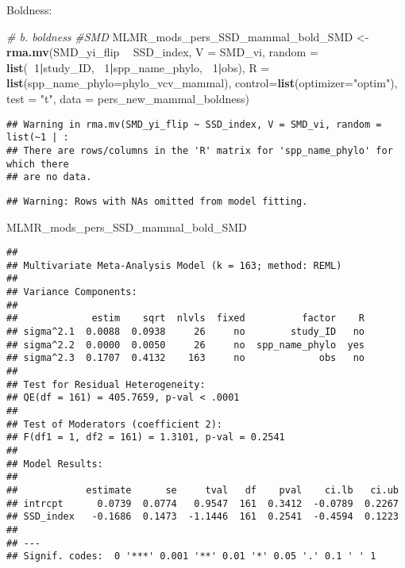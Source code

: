 \documentclass[]{article}
\newenvironment{Shaded}{\begin{snugshade}}{\end{snugshade}}
\newcommand{\KeywordTok}[1]{\textcolor[rgb]{0.13,0.29,0.53}{\textbf{#1}}}
\newcommand{\DataTypeTok}[1]{\textcolor[rgb]{0.13,0.29,0.53}{#1}}
\newcommand{\DecValTok}[1]{\textcolor[rgb]{0.00,0.00,0.81}{#1}}
\newcommand{\StringTok}[1]{\textcolor[rgb]{0.31,0.60,0.02}{#1}}
\newcommand{\CommentTok}[1]{\textcolor[rgb]{0.56,0.35,0.01}{\textit{#1}}}
\newcommand{\OperatorTok}[1]{\textcolor[rgb]{0.81,0.36,0.00}{\textbf{#1}}}
\newcommand{\NormalTok}[1]{#1}
\begin{document}
Boldness:

\begin{Shaded}
\begin{Highlighting}[]
    \CommentTok{# b. boldness}
    \CommentTok{#SMD}
\NormalTok{    MLMR_mods_pers_SSD_mammal_bold_SMD <-}\StringTok{ }\KeywordTok{rma.mv}\NormalTok{(SMD_yi_flip }\OperatorTok{~}\StringTok{ }\NormalTok{SSD_index, }\DataTypeTok{V =}\NormalTok{ SMD_vi, }
                                              \DataTypeTok{random =} \KeywordTok{list}\NormalTok{(}\OperatorTok{~}\DecValTok{1}\OperatorTok{|}\NormalTok{study_ID, }\OperatorTok{~}\DecValTok{1}\OperatorTok{|}\NormalTok{spp_name_phylo, }\OperatorTok{~}\DecValTok{1}\OperatorTok{|}\NormalTok{obs), }
                                              \DataTypeTok{R =} \KeywordTok{list}\NormalTok{(}\DataTypeTok{spp_name_phylo=}\NormalTok{phylo_vcv_mammal), }\DataTypeTok{control=}\KeywordTok{list}\NormalTok{(}\DataTypeTok{optimizer=}\StringTok{"optim"}\NormalTok{), }
                                              \DataTypeTok{test =} \StringTok{"t"}\NormalTok{, }\DataTypeTok{data =}\NormalTok{ pers_new_mammal_boldness)}
\end{Highlighting}
\end{Shaded}

\begin{verbatim}
## Warning in rma.mv(SMD_yi_flip ~ SSD_index, V = SMD_vi, random = list(~1 | :
## There are rows/columns in the 'R' matrix for 'spp_name_phylo' for which there
## are no data.
\end{verbatim}

\begin{verbatim}
## Warning: Rows with NAs omitted from model fitting.
\end{verbatim}

\begin{Shaded}
\begin{Highlighting}[]
\NormalTok{    MLMR_mods_pers_SSD_mammal_bold_SMD    }
\end{Highlighting}
\end{Shaded}

\begin{verbatim}
## 
## Multivariate Meta-Analysis Model (k = 163; method: REML)
## 
## Variance Components:
## 
##             estim    sqrt  nlvls  fixed          factor    R 
## sigma^2.1  0.0088  0.0938     26     no        study_ID   no 
## sigma^2.2  0.0000  0.0050     26     no  spp_name_phylo  yes 
## sigma^2.3  0.1707  0.4132    163     no             obs   no 
## 
## Test for Residual Heterogeneity:
## QE(df = 161) = 405.7659, p-val < .0001
## 
## Test of Moderators (coefficient 2):
## F(df1 = 1, df2 = 161) = 1.3101, p-val = 0.2541
## 
## Model Results:
## 
##            estimate      se     tval   df    pval    ci.lb   ci.ub 
## intrcpt      0.0739  0.0774   0.9547  161  0.3412  -0.0789  0.2267    
## SSD_index   -0.1686  0.1473  -1.1446  161  0.2541  -0.4594  0.1223    
## 
## ---
## Signif. codes:  0 '***' 0.001 '**' 0.01 '*' 0.05 '.' 0.1 ' ' 1
\end{verbatim}
\end{document}
